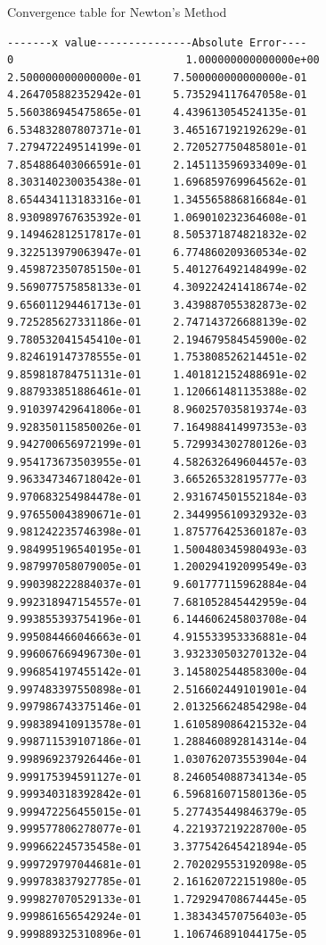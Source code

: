 \documentclass[a4paper,12pt]{article}
\begin{document}
\begin{enumerate}[label = \arabic*.]
\begin{enumerate}[label = \roman*.]
            Convergence table for Newton's Method
            \begin{verbatim}
-------x value---------------Absolute Error----
0                    	    1.000000000000000e+00
2.500000000000000e-01     7.500000000000000e-01
4.264705882352942e-01     5.735294117647058e-01
5.560386945475865e-01     4.439613054524135e-01
6.534832807807371e-01     3.465167192192629e-01
7.279472249514199e-01     2.720527750485801e-01
7.854886403066591e-01     2.145113596933409e-01
8.303140230035438e-01     1.696859769964562e-01
8.654434113183316e-01     1.345565886816684e-01
8.930989767635392e-01     1.069010232364608e-01
9.149462812517817e-01     8.505371874821832e-02
9.322513979063947e-01     6.774860209360534e-02
9.459872350785150e-01     5.401276492148499e-02
9.569077575858133e-01     4.309224241418674e-02
9.656011294461713e-01     3.439887055382873e-02
9.725285627331186e-01     2.747143726688139e-02
9.780532041545410e-01     2.194679584545900e-02
9.824619147378555e-01     1.753808526214451e-02
9.859818784751131e-01     1.401812152488691e-02
9.887933851886461e-01     1.120661481135388e-02
9.910397429641806e-01     8.960257035819374e-03
9.928350115850026e-01     7.164988414997353e-03
9.942700656972199e-01     5.729934302780126e-03
9.954173673503955e-01     4.582632649604457e-03
9.963347346718042e-01     3.665265328195777e-03
9.970683254984478e-01     2.931674501552184e-03
9.976550043890671e-01     2.344995610932932e-03
9.981242235746398e-01     1.875776425360187e-03
9.984995196540195e-01     1.500480345980493e-03
9.987997058079005e-01     1.200294192099549e-03
9.990398222884037e-01     9.601777115962884e-04
9.992318947154557e-01     7.681052845442959e-04
9.993855393754196e-01     6.144606245803708e-04
9.995084466046663e-01     4.915533953336881e-04
9.996067669496730e-01     3.932330503270132e-04
9.996854197455142e-01     3.145802544858300e-04
9.997483397550898e-01     2.516602449101901e-04
9.997986743375146e-01     2.013256624854298e-04
9.998389410913578e-01     1.610589086421532e-04
9.998711539107186e-01     1.288460892814314e-04
9.998969237926446e-01     1.030762073553904e-04
9.999175394591127e-01     8.246054088734134e-05
9.999340318392842e-01     6.596816071580136e-05
9.999472256455015e-01     5.277435449846379e-05
9.999577806278077e-01     4.221937219228700e-05
9.999662245735458e-01     3.377542645421894e-05
9.999729797044681e-01     2.702029553192098e-05
9.999783837927785e-01     2.161620722151980e-05
9.999827070529133e-01     1.729294708674445e-05
9.999861656542924e-01     1.383434570756403e-05
9.999889325310896e-01     1.106746891044175e-05

\end{verbatim}
\end{enumerate}
\end{enumerate}
\end{document}
